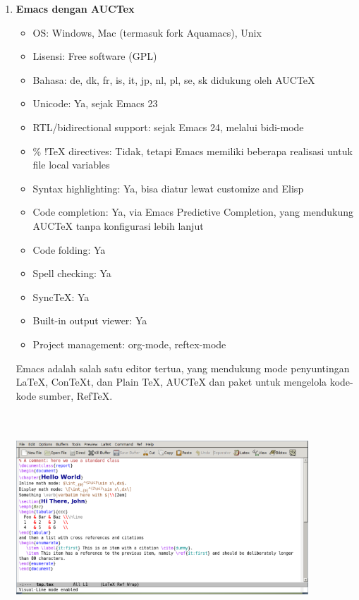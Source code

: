 \begin{enumerate}
\item \textbf{Emacs dengan AUCTex}
\begin{itemize}
\item OS: Windows, Mac (termasuk fork Aquamacs), Unix
\item Lisensi: Free software (GPL)
\item Bahasa: de, dk, fr, is, it, jp, nl, pl, se, sk didukung oleh AUCTeX
\item Unicode: Ya, sejak Emacs 23
\item RTL/bidirectional support: sejak Emacs 24, melalui bidi-mode
\item \% !TeX directives: Tidak, tetapi Emacs memiliki beberapa realisasi untuk file local variables
\item Syntax highlighting: Ya, bisa diatur lewat customize and Elisp
\item Code completion: Ya, via Emacs Predictive Completion, yang mendukung AUCTeX tanpa konfigurasi lebih lanjut
\item Code folding: Ya
\item Spell checking: Ya
\item SyncTeX: Ya
\item Built-in output viewer: Ya
\item Project management: org-mode, reftex-mode
\end{itemize}
\hspace{0,5in}Emacs adalah salah satu editor tertua, yang mendukung mode penyuntingan LaTeX, ConTeXt, dan Plain TeX, AUCTeX dan paket untuk mengelola kode-kode sumber, RefTeX.

\includegraphics[width=10.95cm,height=7.87cm]{gambar/image2.jpg}
\par \vspace{12pt}


\end{enumerate}
